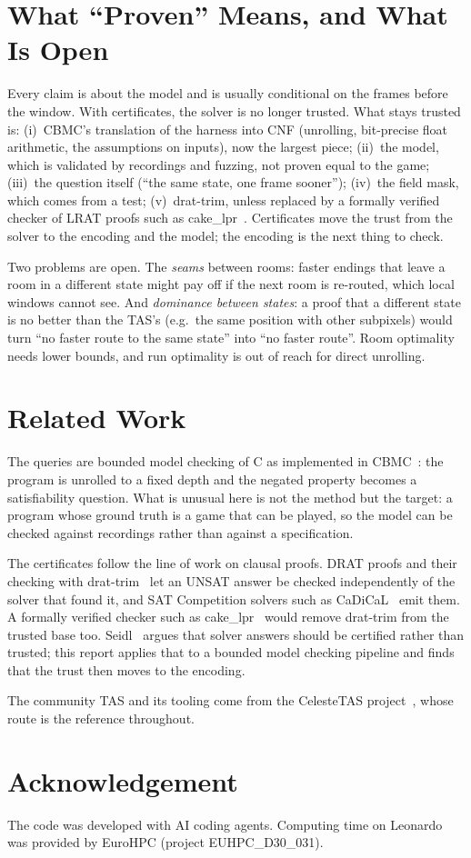 \documentclass[conference]{IEEEtran}
\begin{document}
\section{What ``Proven'' Means, and What Is Open}
Every claim is about the model and is usually conditional on the frames
before the window. With certificates, the solver is no longer trusted. What
stays trusted is:
(i)~CBMC's translation of the harness into CNF (unrolling, bit-precise
float arithmetic, the assumptions on inputs), now the largest piece;
(ii)~the model, which is validated by recordings and fuzzing, not proven equal to the game;
(iii)~the question itself (``the same state, one frame sooner'');
(iv)~the field mask, which comes from a test;
(v)~drat-trim, unless replaced by a formally verified checker of LRAT
proofs such as cake\_lpr~\cite{cakelpr}.
Certificates move the trust from the solver to the encoding and the model;
the encoding is the next thing to check.

Two problems are open. The \emph{seams} between rooms: faster endings that
leave a room in a different state might pay off if the next room is
re-routed, which local windows cannot see. And \emph{dominance between
states}: a proof that a different state is no better than the TAS's
(e.g.\ the same position with other subpixels) would turn ``no faster route to
the same state'' into ``no faster route''. Room optimality needs lower bounds,
and run optimality is out of reach for direct unrolling.

\section{Related Work}
The queries are bounded model checking of C as implemented in
CBMC~\cite{cbmc}: the program is unrolled to a fixed depth and
the negated property becomes a satisfiability question. What is unusual here
is not the method but the target: a program whose ground truth is a game that
can be played, so the model can be checked against recordings rather than
against a specification.

The certificates follow the line of work on clausal proofs. DRAT proofs and
their checking with drat-trim~\cite{drat,drattrim} let an UNSAT answer be
checked independently of the solver that found it, and SAT Competition
solvers such as CaDiCaL~\cite{cadical} emit them. A formally verified
checker such as cake\_lpr~\cite{cakelpr} would remove drat-trim from the
trusted base too. Seidl~\cite{seidl} argues that solver answers should be
certified rather than trusted; this report applies that to a bounded model
checking pipeline and finds that the trust then moves to the encoding.

The community TAS and its tooling come from the CelesteTAS
project~\cite{celestetas}, whose route is the reference throughout.

\section*{Acknowledgement}
The code was developed with AI coding agents. Computing time on Leonardo was
provided by EuroHPC (project EUHPC\_D30\_031).



\end{document}
